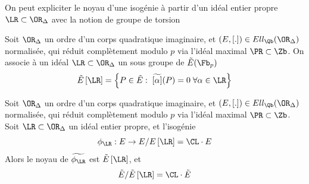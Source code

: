 On peut expliciter le noyau d'une isogénie à partir d'un idéal entier propre $\LR\subset\OR_{\Delta}$ avec la notion de groupe de torsion

\begin{Def}
	
	Soit $\OR_{\Delta}$ un ordre d'un corps quadratique imaginaire, et $(E,[.])\in Ell_{\Qb}(\OR_{\Delta})$ normalisée, qui réduit complètement modulo $p$ via l'idéal maximal $\PR\subset\Zb$. On associe à un idéal $\LR\subset\OR_{\Delta}$ un sous groupe de $\tilde{E}(\Fb_{p})$
	\begin{equation*}
		\tilde{E}\left[ \LR\right] = \left\lbrace P\in\tilde{E} :\; \widetilde{\left[ \alpha\right] }(P) = 0 \;\forall\alpha\in\LR\right\rbrace 
	\end{equation*} 
	
\end{Def}

\begin{Prop}
	Soit $\OR_{\Delta}$ un ordre d'un corps quadratique imaginaire, et $(E,[.])\in Ell_{\Qb}(\OR_{\Delta})$ normalisée, qui réduit complètement modulo $p$ via l'idéal maximal $\PR\subset\Zb$. Soit $\LR\subset\OR_{\Delta}$ un idéal entier propre, et l'isogénie
	\begin{equation*}
		\phi_{\LR} : E\rightarrow E/E\left[ \LR\right] = \CL\cdot E
	\end{equation*} 
	Alors le noyau de $\widetilde{\phi_{\LR}}$ est $\tilde{E}\left[ \LR\right]$, et
	\begin{equation*}
		\tilde{E}/\tilde{E}\left[ \LR\right] = \CL\cdot \tilde{E}
	\end{equation*}
\end{Prop}

